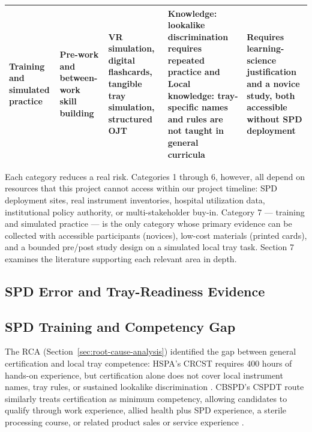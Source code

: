 \documentclass[10pt,a4paper]{article}
\begin{document}
\begin{table}[H]
\begin{tabularx}{\textwidth}{|>{\raggedright\arraybackslash}p{2.2cm}|>{\raggedright\arraybackslash}p{1.8cm}|>{\raggedright\arraybackslash}X|>{\raggedright\arraybackslash}p{3cm}|>{\raggedright\arraybackslash}X|}
\hline
Training and simulated practice & Pre-work and between-work skill building & VR simulation, digital flashcards, tangible tray simulation, structured OJT & Knowledge: lookalike discrimination requires repeated practice and Local knowledge: tray-specific names and rules are not taught in general curricula & Requires learning-science justification and a novice study, both accessible without SPD deployment \\
\hline
\end{tabularx}
\end{table}
Each category reduces a real risk. Categories 1 through 6, however, all depend
on resources that this project cannot access within our project timeline: SPD
deployment sites, real instrument inventories, hospital utilization data,
institutional policy authority, or multi-stakeholder buy-in. Category 7 —
training and simulated practice — is the only category whose primary evidence
can be collected with accessible participants (novices), low-cost materials
(printed cards), and a bounded pre/post study design on a simulated local tray
task. Section 7 examines the literature supporting each
relevant area in depth.
\subsection{SPD Error and Tray-Readiness Evidence}
\label{sec:spd-training-and-competency-context}
\subsection{SPD Training and Competency Gap}


The RCA (Section~\ref{sec:root-cause-analysis}) identified the gap between general certification and local tray competence: HSPA's CRCST requires 400 hours of hands-on experience, but certification alone does not cover local instrument names, tray rules, or sustained lookalike discrimination \cite{hspa-crcst-accessed-2026}. CBSPD's CSPDT route similarly treats certification as minimum competency, allowing candidates to qualify through work experience, allied health plus SPD experience, a sterile processing course, or related product sales or service experience \cite{cbspd-technician-accessed-2026}.
\end{document}
